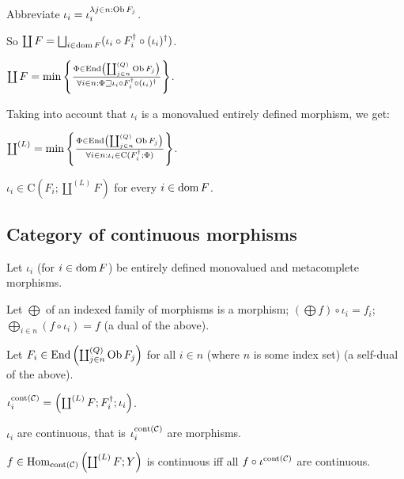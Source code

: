 Abbreviate $\iota_i = \iota^{\lambda j \in n : \operatorname{Ob} F_j}_i$.

So $\coprod F = \bigsqcup_{i \in \dom F} (\iota_i \circ F_i^{\dagger}
\circ (\iota_i)^{\dagger})$.

$\coprod F = \min \left\{ \frac{ \Phi \in \operatorname{End} \left( \coprod^{(Q)}_{j \in n}
\operatorname{Ob} F_j \right) }{ \forall i \in n : \Phi
\sqsupseteq \iota_i \circ F_i^{\dagger} \circ (\iota_i)^{\dagger} }\right\}$.

Taking into account that $\iota_i$ is a monovalued entirely defined morphism,
we get:

\begin{obvious}
$\coprod^{(L)} = \min \left\{ \frac{ \Phi \in \operatorname{End} \left( \coprod^{(Q)}_{j \in
n} \operatorname{Ob} F_j \right) }{ \forall i \in n : \iota_i
\in \mathrm{C} (F_i^{\dagger} ; \Phi) }\right\}$.{\hspace*{\fill}}{\medskip}
\end{obvious}

\begin{cor}
  $\iota_i \in \mathrm{C} \left( F_i ; \coprod^{(L)} F \right)$ for every $i
  \in \operatorname{dom} F$.
\end{cor}

\subsection{Category of continuous morphisms}

Let $\iota_i$ (for $i \in \operatorname{dom} F$) be entirely defined monovalued and
metacomplete morphisms.

Let $\bigoplus$ of an indexed family of morphisms is a morphism; $\left(
\bigoplus f \right) \circ \iota_i = f_i$; $\bigoplus_{i \in n} (f \circ
\iota_i) = f$ (a dual of the above).

Let $F_i \in \operatorname{End} \left( \coprod^{(Q)}_{j \in n} \operatorname{Ob} F_j \right)$
for all $i \in n$ (where $n$ is some index set) (a self-dual of the above).

\begin{defn}
  $\iota^{\operatorname{cont} (\mathcal{C})}_i = \left( \coprod^{(L)} F ;
  F_i^{\dagger} ; \iota_i \right)$.
\end{defn}

\begin{prop}
  $\iota_i$ are continuous, that is $\iota^{\operatorname{cont}
  (\mathcal{C})}_i$ are morphisms.
\end{prop}

\begin{lem}
  $f \in \operatorname{Hom}_{\operatorname{cont} (\mathcal{C})} \left(
  \coprod^{(L)} F ; Y \right)$  is continuous iff all $f \circ
  \iota^{\operatorname{cont} (\mathcal{C})}$ are continuous.
\end{lem}

